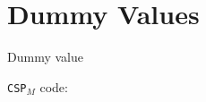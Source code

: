 \documentclass[11pt]{beamer}
\newcommand{\cspm}{CSP$_M$}
\begin{document}
%
%
%

\section{Dummy Values}
%
\begin{frame}{Dummy value}
      \begin{block}{}
       \texttt{\cspm{}} code:
         \vspace{5mm}

          \scalebox{0.8}{\usebox{\dummyvalue}}
      \end{block}
\end{frame}
\end{document}
